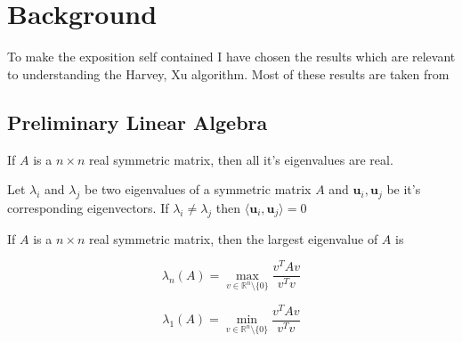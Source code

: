 
\chapter{Background} %
\newcommand{\Mset}[2]{\ensuremath{\mathbb{M}_{#1 \times #2}}}
\newcommand{\reff}[1][e]{\ensuremath{R_#1^{\text{eff}}}}
\label{Chapter2} %

% 
% 

To make the exposition self contained I have chosen the results which are relevant to understanding the Harvey, Xu algorithm. Most of these results are taken from \citet{TCS-054}

\section{Preliminary Linear Algebra}

\begin{Bf}
 If $A$ is a $n \times n$ real symmetric matrix, then all it's eigenvalues are real. 
\end{Bf}

\begin{Bf}
 Let $\lambda_i$ and $\lambda_j$ be two eigenvalues of a symmetric matrix $A$ and $\textbf{u}_i, \textbf{u}_j$ be it's corresponding eigenvectors. If $\lambda_i \neq \lambda_j$ then $\langle \textbf{u}_i, \textbf{u}_j \rangle = 0$
\end{Bf}

\begin{Bf}
 If $A$ is a $n \times n$ real symmetric matrix, then the largest eigenvalue of $A$ is 
 
 $$ \lambda_n(A) = \max_{v \in \mathbb{R}^n \setminus \{0\}} \frac{v^T A v}{v^Tv}$$
 
 $$ \lambda_1(A) = \min_{v \in \mathbb{R}^n \setminus \{0\}} \frac{v^T A v}{v^Tv}$$
\end{Bf}


